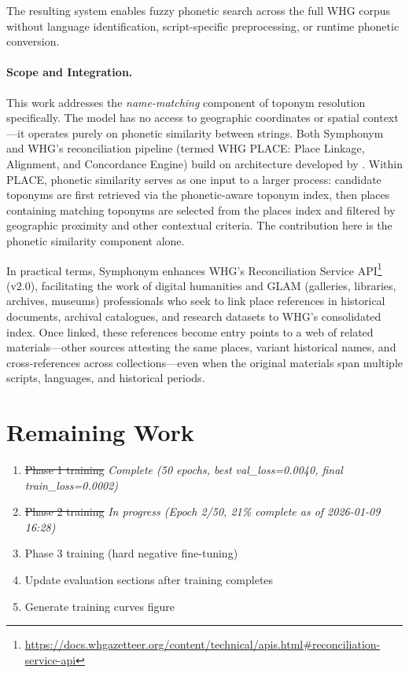 \documentclass[11pt,a4paper]{article}
\begin{document}
The resulting system enables fuzzy phonetic search across the full WHG corpus without language identification, script-specific preprocessing, or runtime phonetic conversion.

\paragraph{Scope and Integration.} This work addresses the \emph{name-matching} component of toponym resolution specifically. The model has no access to geographic coordinates or spatial context---it operates purely on phonetic similarity between strings. Both Symphonym and WHG's reconciliation pipeline (termed WHG PLACE: Place Linkage, Alignment, and Concordance Engine) build on architecture developed by \citet{grossner2021whg}. Within PLACE, phonetic similarity serves as one input to a larger process: candidate toponyms are first retrieved via the phonetic-aware toponym index, then places containing matching toponyms are selected from the places index and filtered by geographic proximity and other contextual criteria. The contribution here is the phonetic similarity component alone.

In practical terms, Symphonym enhances WHG's Reconciliation Service API\footnote{\url{https://docs.whgazetteer.org/content/technical/apis.html\#reconciliation-service-api}} (v2.0), facilitating the work of digital humanities and GLAM (galleries, libraries, archives, museums) professionals who seek to link place references in historical documents, archival catalogues, and research datasets to WHG's consolidated index. Once linked, these references become entry points to a web of related materials---other sources attesting the same places, variant historical names, and cross-references across collections---even when the original materials span multiple scripts, languages, and historical periods.

\section*{Remaining Work}
\begin{enumerate}
\item \sout{Phase 1 training} \textit{Complete (50 epochs, best val\_loss=0.0040, final train\_loss=0.0002)}
\item \sout{Phase 2 training} \textit{In progress (Epoch 2/50, 21\% complete as of 2026-01-09 16:28)}
\item Phase 3 training (hard negative fine-tuning)
\item Update evaluation sections after training completes
\item Generate training curves figure
\end{enumerate}
\end{document}
